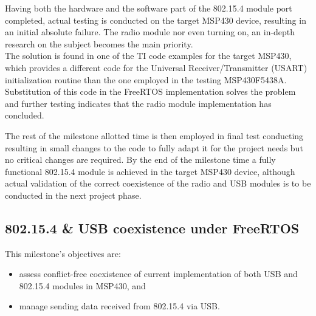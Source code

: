 \begin{enumerate}
		Having both the hardware and the software part of the 802.15.4 module port completed, actual testing is conducted on the target MSP430 device, resulting in an initial absolute failure. The radio module nor even turning on, an in-depth research on the subject becomes the main priority.\\

		The solution is found in one of the TI code examples for the target MSP430, which provides a different code for the Universal Receiver/Transmitter (USART) initialization routine than the one employed in the testing MSP430F5438A. Substitution of this code in the FreeRTOS implementation solves the problem and further testing indicates that the radio module implementation has concluded.\\

		\end{enumerate}

		The rest of the milestone allotted time is then employed in final test conducting resulting in small changes to the code to fully adapt it for the project needs but no critical changes are required. By the end of the milestone time a fully functional 802.15.4 module is achieved in the target MSP430 device, although actual validation of the correct coexistence of the radio and USB modules is to be conducted in the next project phase.\\


		\subsection{802.15.4 \& USB coexistence under FreeRTOS}
		\label{ssec:802.15.4.USB.FreeRTOS}	
		This milestone's objectives are:
		\begin{itemize}
		\item assess conflict-free coexistence of current implementation of both USB and 802.15.4 modules in MSP430, and
		\item manage sending data received from 802.15.4 via USB.
		\end{itemize}
		
